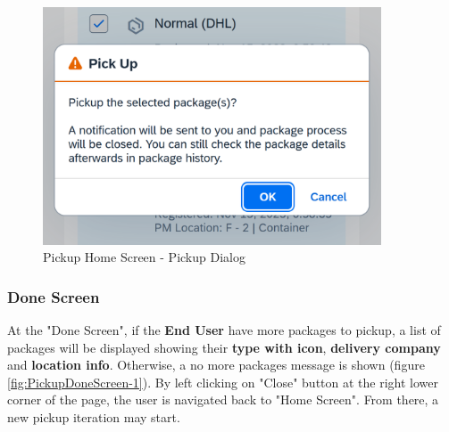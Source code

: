 \begin{figure}[H]
	\centering
	\includegraphics[height=200pt]{images/user_doc/pickup/PickupDialog.png}
	\caption{Pickup Home Screen - Pickup Dialog}
	\label{fig:PickupDialog}
\end{figure}


\subsubsection{Done Screen}

At the "Done Screen", if the \textbf{End User} have more packages to pickup, a list of packages will be displayed showing their \textbf{type with icon}, \textbf{delivery company} and \textbf{location info}. Otherwise, a no more packages message is shown (figure \ref{fig:PickupDoneScreen-1}). 
By left clicking on "Close" button at the right lower corner of the page, the user is navigated back to "Home Screen".
From there, a new pickup iteration may start.

